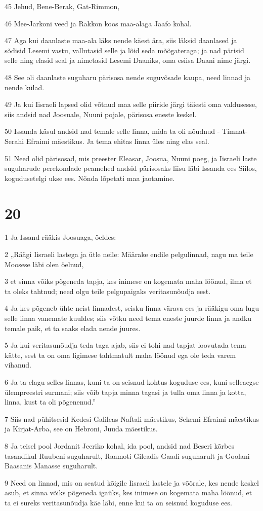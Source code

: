 \par 45 Jehud, Bene-Berak, Gat-Rimmon,
\par 46 Mee-Jarkoni veed ja Rakkon koos maa-alaga Jaafo kohal.
\par 47 Aga kui daanlaste maa-ala läks nende käest ära, siis läksid daanlased ja sõdisid Lesemi vastu, vallutasid selle ja lõid seda mõõgateraga; ja nad pärisid selle ning elasid seal ja nimetasid Lesemi Daaniks, oma esiisa Daani nime järgi.
\par 48 See oli daanlaste suguharu pärisosa nende suguvõsade kaupa, need linnad ja nende külad.
\par 49 Ja kui Iisraeli lapsed olid võtnud maa selle piiride järgi täiesti oma valdusesse, siis andsid nad Joosuale, Nuuni pojale, pärisosa eneste keskel.
\par 50 Issanda käsul andsid nad temale selle linna, mida ta oli nõudnud - Timnat-Serahi Efraimi mäestikus. Ja tema ehitas linna üles ning elas seal.
\par 51 Need olid pärisosad, mis preester Eleasar, Joosua, Nuuni poeg, ja Iisraeli laste suguharude perekondade peamehed andsid pärisosaks liisu läbi Issanda ees Siilos, kogudusetelgi ukse ees. Nõnda lõpetati maa jaotamine.

\chapter{20}

\par 1 Ja Issand rääkis Joosuaga, öeldes:
\par 2 „Räägi Iisraeli lastega ja ütle neile: Määrake endile pelgulinnad, nagu ma teile Moosese läbi olen öelnud,
\par 3 et sinna võiks põgeneda tapja, kes inimese on kogemata maha löönud, ilma et ta oleks tahtnud; need olgu teile pelgupaigaks veritasunõudja eest.
\par 4 Ja kes põgeneb ühte neist linnadest, seisku linna värava ees ja rääkigu oma lugu selle linna vanemate kuuldes; siis võtku need tema eneste juurde linna ja andku temale paik, et ta saaks elada nende juures.
\par 5 Ja kui veritasunõudja teda taga ajab, siis ei tohi nad tapjat loovutada tema kätte, sest ta on oma ligimese tahtmatult maha löönud ega ole teda varem vihanud.
\par 6 Ja ta elagu selles linnas, kuni ta on seisnud kohtus koguduse ees, kuni selleaegse ülempreestri surmani; siis võib tapja minna tagasi ja tulla oma linna ja kotta, linna, kust ta oli põgenenud.”
\par 7 Siis nad pühitsesid Kedesi Galileas Naftali mäestikus, Sekemi Efraimi mäestikus ja Kirjat-Arba, see on Hebroni, Juuda mäestikus.
\par 8 Ja teisel pool Jordanit Jeeriko kohal, ida pool, andsid nad Beseri kõrbes tasandikul Ruubeni suguharult, Raamoti Gileadis Gaadi suguharult ja Goolani Baasanis Manasse suguharult.
\par 9 Need on linnad, mis on seatud kõigile Iisraeli lastele ja võõrale, kes nende keskel asub, et sinna võiks põgeneda igaüks, kes inimese on kogemata maha löönud, et ta ei sureks veritasunõudja käe läbi, enne kui ta on seisnud koguduse ees.

